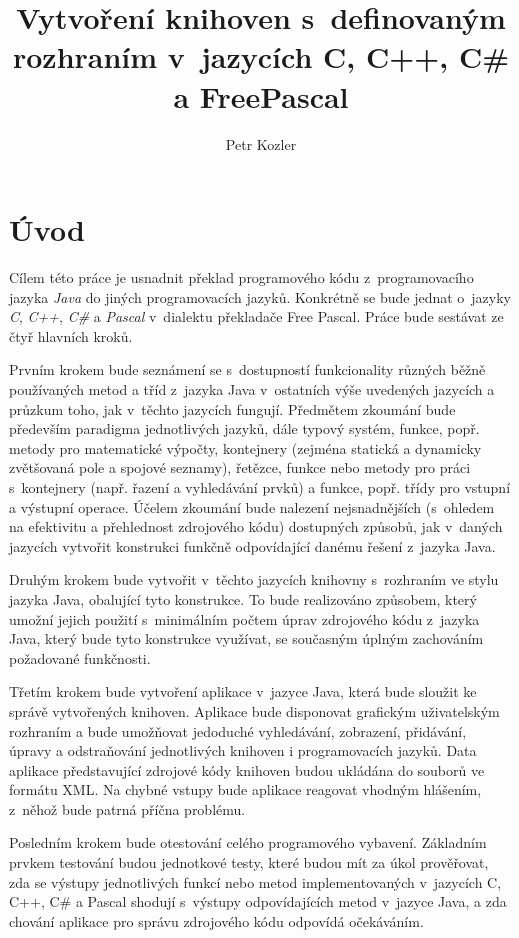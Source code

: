 \documentclass[czech,BP]{thesiskiv}
\author{Petr Kozler}
\title{Vytvoření knihoven s~definovaným rozhraním v~jazycích C, C++, C\# a FreePascal}
\begin{document}
%
\maketitle
\tableofcontents

\chapter{Úvod}
Cílem této práce je usnadnit překlad programového kódu z~programovacího jazyka \textit{Java} do jiných programovacích jazyků. Konkrétně se bude jednat o~jazyky \textit{C}, \textit{C++}, \textit{C\#} a \textit{Pascal} v~dialektu překladače Free Pascal. Práce bude sestávat ze čtyř hlavních kroků.\par
Prvním krokem bude seznámení se s~dostupností funkcionality různých běžně používaných metod a tříd z~jazyka Java v~ostatních výše uvedených jazycích a průzkum toho, jak v~těchto jazycích fungují. Předmětem zkoumání bude především paradigma jednotlivých jazyků, dále typový systém, funkce, popř. metody pro matematické výpočty, kontejnery (zejména statická a dynamicky zvětšovaná pole a spojové seznamy), řetězce, funkce nebo metody pro práci s~kontejnery (např. řazení a vyhledávání prvků) a funkce, popř. třídy pro vstupní a výstupní operace. Účelem zkoumání bude nalezení nejsnadnějších (s~ohledem na efektivitu a přehlednost zdrojového kódu) dostupných způsobů, jak v~daných jazycích vytvořit konstrukci funkčně odpovídající danému řešení z~jazyka Java.\par
Druhým krokem bude vytvořit v~těchto jazycích knihovny s~rozhraním ve stylu jazyka Java, obalující tyto konstrukce. To bude realizováno způsobem, který umožní jejich použití s~minimálním počtem úprav zdrojového kódu z~jazyka Java, který bude tyto konstrukce využívat, se současným úplným zachováním požadované funkčnosti.\par
Třetím krokem bude vytvoření aplikace v~jazyce Java, která bude sloužit ke správě vytvořených knihoven. Aplikace bude disponovat grafickým uživatelským rozhraním a bude umožňovat jedoduché vyhledávání, zobrazení, přidávání, úpravy a odstraňování jednotlivých knihoven i programovacích jazyků. Data aplikace představující zdrojové kódy knihoven budou ukládána do souborů ve formátu XML. Na chybné vstupy bude aplikace reagovat vhodným hlášením, z~něhož bude patrná příčna problému.\par
Posledním krokem bude otestování celého programového vybavení. Základním prvkem testování budou jednotkové testy, které budou mít za úkol prověřovat, zda se výstupy jednotlivých funkcí nebo metod implementovaných v~jazycích C, C++, C\# a Pascal shodují s~výstupy odpovídajících metod v~jazyce Java, a zda chování aplikace pro správu zdrojového kódu odpovídá očekáváním.
\end{document}
